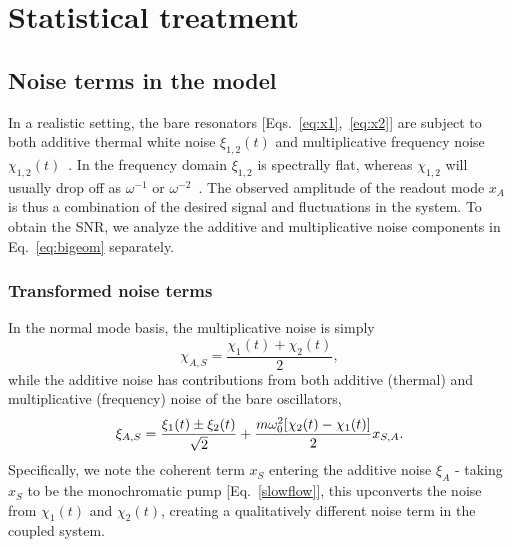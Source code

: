 \section{Statistical treatment} \label{sec:spins_stochastic}
\subsection{Noise terms in the model}
In a realistic setting, the bare resonators [Eqs.~\eqref{eq:x1},~\eqref{eq:x2}] are subject to both additive thermal white noise $\xi_{1,2}(t)$ and multiplicative frequency noise $\chi_{1,2}(t)$~\cite{Cleland_2002}. In the frequency domain $\xi_{1,2}$ is spectrally flat, whereas $\chi_{1,2}$ will usually drop off as $\omega^{-1}$ or $\omega^{-2}$~\cite{Fong_2012}. The observed amplitude of the readout mode $x_A$ is thus a combination of the desired signal and fluctuations in the system. To obtain the SNR, we analyze the additive and multiplicative noise components in Eq.~\eqref{eq:bigeom} separately.

\subsubsection{Transformed noise terms} 
In the normal mode basis, the multiplicative noise is simply
\begin{equation}
\chi_{A,S} = \frac{\chi_1(t) + \chi_2(t)}{2},
\end{equation}
while the additive noise has contributions from both additive (thermal) and multiplicative (frequency) noise of the bare oscillators,
\begin{equation}
\xi_{A,S} = \frac{\xi_1(t)\pm\xi_2(t)}{\sqrt{2}}+ \frac{m\omega_0^2[\chi_2(t) - \chi_1(t)] }{2} x_{S,A}. \\
\end{equation}
Specifically, we note the coherent term $x_S$ entering the additive noise $\xi_A$ - taking $x_S$ to be the monochromatic pump [Eq.~\eqref{slowflow}], this upconverts the noise from $\chi_1(t)$ and $\chi_2(t)$, creating a qualitatively different noise term in the coupled system.

